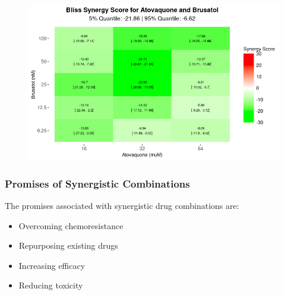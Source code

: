 \documentclass{beamer}
\begin{document}
\begin{frame}
\begin{figure}[!htb]
\begin{minipage}[b]{0.49\textwidth}
\begin{subfigure}[c]{\textwidth}
	\end{subfigure}
      \end{minipage}\hfill
      \begin{minipage}[b]{0.49\textwidth}
	\vfill
	\includegraphics[width=\textwidth]{figs/ato-bru-bliss-heatmap.png}
	\vfill
      \end{minipage}
  \end{figure}
\end{frame}

\begin{frame}
  \frametitle{Promises of Synergistic Combinations}
  The promises associated with synergistic drug combinations are:
  \begin{center}
    \begin{itemize}
      \item Overcoming chemoresistance \only<2>{\checkmark} 
      \item Repurposing existing drugs 
      \item Increasing efficacy 
      \item \alert<2>{Reducing toxicity}
    \end{itemize}
  \end{center}

\end{frame}
\end{document}
